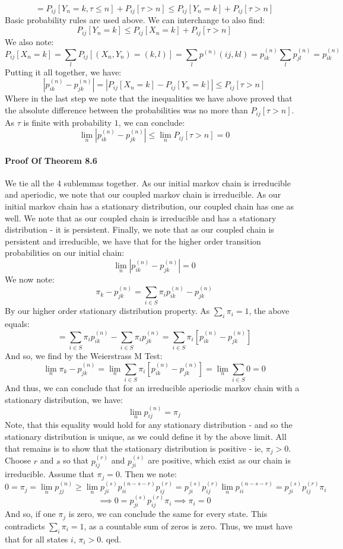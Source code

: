 \documentclass[12pt,a4paper]{article}
\newcommand{\1}[1]{\mathbbm{1}\left\{ #1 \right\}}
\begin{document}
$$
	= P_{ij}\left[Y_n = k, \tau \leq n\right] + P_{ij}\left[\tau > n\right] \leq 
	P_{ij}\left[Y_n = k\right] + P_{ij}\left[\tau > n\right]
$$
Basic probability rules are used above. We can interchange to also find:
$$
	P_{ij}\left[Y_n = k\right] \leq P_{ij}\left[X_n = k\right] + P_{ij}\left[\tau > n\right]
$$
We also note:
$$
	P_{ij}\left[X_n = k\right] = \sum_l P_{ij}\left[(X_n, Y_n) = (k,l)\right] = \sum_l p^{(n)}(ij, kl) =
	p_{ik}^{(n)}\sum_l p_{jl}^{(n)} = p_{ik}^{(n)} 
$$
Putting it all together, we have:
$$
	\left|p_{ik}^{(n)} - p_{jk}^{(n)}\right| =
	\left|P_{ij}\left[X_n = k\right] - P_{ij}\left[Y_n = k\right]\right| \leq P_{ij}\left[\tau > n\right]
$$
Where in the last step we note that the inequalities we have above proved that the absolute difference between the probabilities was no more than $P_{ij}\left[\tau > n\right]$. As $\tau$ is finite with probability $1$, we can conclude:
$$
	\lim_n \left|p_{ik}^{(n)} - p_{jk}^{(n)}\right| \leq \lim_n P_{ij}\left[\tau > n\right] = 0
$$

\paragraph{Proof Of Theorem 8.6} We tie all the 4 sublemmas together. As our initial markov chain is irreducible and aperiodic, we note that our coupled markov chain is irreducible. As our initial markov chain has a stationary distribution, our coupled chain has one as well. We note that as our coupled chain is irreducible and has a stationary distribution - it is persistent. Finally, we note that as our coupled chain is persistent and irreducible, we have that for the higher order transition probabilities on our initial chain:
$$
	\lim_n \left|p_{ik}^{(n)} - p_{jk}^{(n)}\right| = 0
$$
We now note:
$$
	\pi_k - p_{jk}^{(n)} = \sum_{i \in S} \pi_i p_{ik}^{(n)} - p_{jk}^{(n)}
$$
By our higher order stationary distribution property. As $\sum_i \pi_i = 1$, the above equals:
$$
	= \sum_{i \in S} \pi_i p_{ik}^{(n)} - \sum_{i \in S} \pi_i p_{jk}^{(n)} =
	\sum_{i \in S} \pi_i \left[p_{ik}^{(n)} - p_{jk}^{(n)}\right]
$$
And so, we find by the Weierstrass M Test:
$$
	\lim_n \pi_k - p_{jk}^{(n)} = \lim_n \sum_{i \in S} \pi_i \left[p_{ik}^{(n)} - p_{jk}^{(n)}\right] =
	\lim_n \sum_{i \in S} 0 = 0
$$
And thus, we can conclude that for an irreducible aperiodic markov chain with a stationary distribution, we have:
$$
	\lim_n p_{ij}^{(n)} = \pi_j
$$
Note, that this equality would hold for any stationary distribution - and so the stationary distribution is unique, as we could define it by the above limit. All that remains is to show that the stationary distribution is positive - ie, $\pi_j > 0$. Choose $r$ and $s$ so that $p_{ij}^{(r)}$ and $p_{ji}^{(s)}$ are positive, which exist as our chain is irreducible. Assume that $\pi_j = 0$. Then we note:
$$
	0 = \pi_j = \lim_n p_{jj}^{(n)} \geq \lim_n p_{ji}^{(s)}p_{ii}^{(n-s-r)}p_{ij}^{(r)} =
	p_{ji}^{(s)}p_{ij}^{(r)} \lim_n p_{ii}^{(n-s-r)} = p_{ji}^{(s)}p_{ij}^{(r)} \pi_i
$$
$$
	\implies 0 = p_{ji}^{(s)}p_{ij}^{(r)} \pi_i \implies \pi_i = 0
$$
And so, if one $\pi_j$ is zero, we can conclude the same for every state. This contradicts $\sum_i \pi_i = 1$, as a countable sum of zeros is zero. Thus, we must have that for all states $i$, $\pi_i > 0$. qed.
\end{document}
